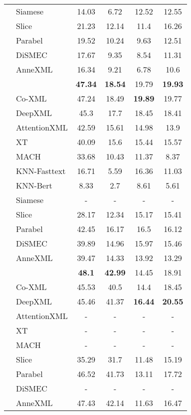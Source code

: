 \begin{table}[ht]
{\begin{tabular}{@{}c|l|cc|cc@{}}
	 & Siamese	 & 14.03	 & 6.72	 & 12.52	 & 12.55 \\
	 & Slice	 & 21.23	 & 12.14	 & 11.4	 & 16.26 \\
	 & Parabel	 & 19.52	 & 10.24	 & 9.63	 & 12.51 \\
	 & DiSMEC	 & 17.67	 & 9.35	 & 8.54	 & 11.31 \\
	 & AnneXML	 & 16.34	 & 9.21	 & 6.78	 & 10.6 \\
	 \midrule
	 \multirow{13}{*}{\textbf{\rotatebox{90}{WikiTitles-500K}}}	 & \algp	 & \textbf{47.34}	 & \textbf{18.54}	 & 19.79	 & \textbf{19.93} \\
	 & Co-XML	 & 47.24	 & 18.49	 & \textbf{19.89}	 & 19.77 \\
	 & DeepXML	 & 45.3	 & 17.7	 & 18.45	 & 18.41 \\
	 & AttentionXML	 & 42.59	 & 15.61	 & 14.98	 & 13.9 \\
	 & XT	 & 40.09	 & 15.6	 & 15.44	 & 15.57 \\
	 & MACH	 & 33.68	 & 10.43	 & 11.37	 & 8.37 \\
	 & KNN-Fasttext	 & 16.71	 & 5.59	 & 16.36	 & 11.03 \\
	 & KNN-Bert	 & 8.33	 & 2.7	 & 8.61	 & 5.61 \\
	 & Siamese	 & -	 & -	 & -	 & - \\
	 & Slice	 & 28.17	 & 12.34	 & 15.17	 & 15.41 \\
	 & Parabel	 & 42.45	 & 16.17	 & 16.5	 & 16.12 \\
	 & DiSMEC	 & 39.89	 & 14.96	 & 15.97	 & 15.46 \\
	 & AnneXML	 & 39.47	 & 14.33	 & 13.92	 & 13.29 \\
	 \midrule
	 \multirow{10}{*}{\textbf{\rotatebox{90}{AmazonTitles-1.6M}}}	 & \algp	 & \textbf{48.1}	 & \textbf{42.99}	 & 14.45	 & 18.91 \\
	 & Co-XML	 & 45.53	 & 40.5	 & 14.4	 & 18.45 \\
	 & DeepXML	 & 45.46	 & 41.37	 & \textbf{16.44}	 & \textbf{20.55} \\
	 & AttentionXML	 & -	 & -	 & -	 & - \\
	 & XT	 & -	 & -	 & -	 & - \\
	 & MACH	 & -	 & -	 & -	 & - \\
	 & Slice	 & 35.29	 & 31.7	 & 11.48	 & 15.19 \\
	 & Parabel	 & 46.52	 & 41.73	 & 13.11	 & 17.72 \\
	 & DiSMEC	 & -	 & -	 & -	 & - \\
	 & AnneXML	 & 47.43	 & 42.14	 & 11.63	 & 16.47 \\
    \bottomrule
    \end{tabular}
    }
\end{table}